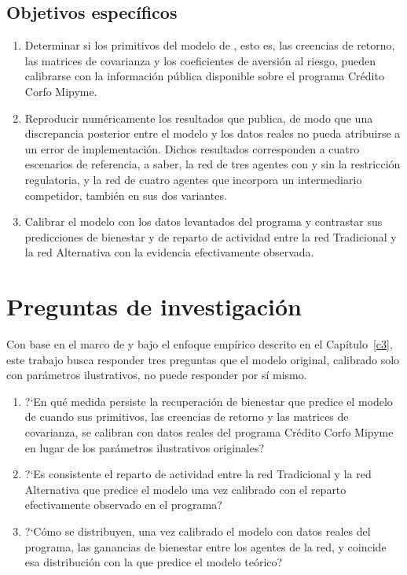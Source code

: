 \subsection{Objetivos específicos}

\begin{enumerate}
    \item Determinar si los primitivos del modelo de , esto es, las creencias de retorno, las matrices de covarianza y los coeficientes de aversión al riesgo, pueden calibrarse con la información pública disponible sobre el programa Crédito Corfo Mipyme.
    \item Reproducir numéricamente los resultados que  publica, de modo que una discrepancia posterior entre el modelo y los datos reales no pueda atribuirse a un error de implementación. Dichos resultados corresponden a cuatro escenarios de referencia, a saber, la red de tres agentes con y sin la restricción regulatoria, y la red de cuatro agentes que incorpora un intermediario competidor, también en sus dos variantes.
    \item Calibrar el modelo con los datos levantados del programa y contrastar sus predicciones de bienestar y de reparto de actividad entre la red Tradicional y la red Alternativa con la evidencia efectivamente observada.
\end{enumerate}

\section{Preguntas de investigación}
\label{c1:preguntas}

Con base en el marco de  y bajo el enfoque empírico descrito en el Capítulo~\ref{c3}, este trabajo busca responder tres preguntas que el modelo original, calibrado solo con parámetros ilustrativos, no puede responder por sí mismo.

\begin{enumerate}
    \item ?`En qué medida persiste la recuperación de bienestar que predice el
    modelo de  cuando sus primitivos, las
    creencias de retorno y las matrices de covarianza, se calibran con datos
    reales del programa Crédito Corfo Mipyme en lugar de los parámetros
    ilustrativos originales?
    \item ?`Es consistente el reparto de actividad entre la red Tradicional y
    la red Alternativa que predice el modelo una vez calibrado con el reparto
    efectivamente observado en el programa?
    \item ?`Cómo se distribuyen, una vez calibrado el modelo con datos reales
    del programa, las ganancias de bienestar entre los agentes de la red, y
    coincide esa distribución con la que predice el modelo teórico?
\end{enumerate}

